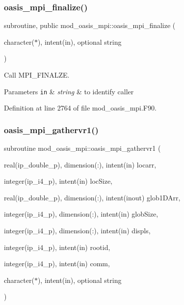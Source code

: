 \subsubsection{\texorpdfstring{oasis\+\_\+mpi\+\_\+finalize()}{oasis\_mpi\_finalize()}}
{\footnotesize\ttfamily subroutine, public mod\+\_\+oasis\+\_\+mpi\+::oasis\+\_\+mpi\+\_\+finalize (\begin{DoxyParamCaption}\item[{character($\ast$), intent(in), optional}]{string }\end{DoxyParamCaption})}



Call M\+P\+I\+\_\+\+F\+I\+N\+A\+L\+ZE. 


\begin{DoxyParams}[1]{Parameters}
\mbox{\tt in}  & {\em string} & to identify caller \\
\hline
\end{DoxyParams}


Definition at line 2764 of file mod\+\_\+oasis\+\_\+mpi.\+F90.

\mbox{\label{namespacemod__oasis__mpi_a88a13ea3b4f96074669fdc872fe41728}} 
\subsubsection{\texorpdfstring{oasis\+\_\+mpi\+\_\+gathervr1()}{oasis\_mpi\_gathervr1()}}
{\footnotesize\ttfamily subroutine mod\+\_\+oasis\+\_\+mpi\+::oasis\+\_\+mpi\+\_\+gathervr1 (\begin{DoxyParamCaption}\item[{real(ip\+\_\+double\+\_\+p), dimension(\+:), intent(in)}]{locarr,  }\item[{integer(ip\+\_\+i4\+\_\+p), intent(in)}]{loc\+Size,  }\item[{real(ip\+\_\+double\+\_\+p), dimension(\+:), intent(inout)}]{glob1\+D\+Arr,  }\item[{integer(ip\+\_\+i4\+\_\+p), dimension(\+:), intent(in)}]{glob\+Size,  }\item[{integer(ip\+\_\+i4\+\_\+p), dimension(\+:), intent(in)}]{displs,  }\item[{integer(ip\+\_\+i4\+\_\+p), intent(in)}]{rootid,  }\item[{integer(ip\+\_\+i4\+\_\+p), intent(in)}]{comm,  }\item[{character($\ast$), intent(in), optional}]{string }\end{DoxyParamCaption})\hspace{0.3cm}{\ttfamily [private]}}



